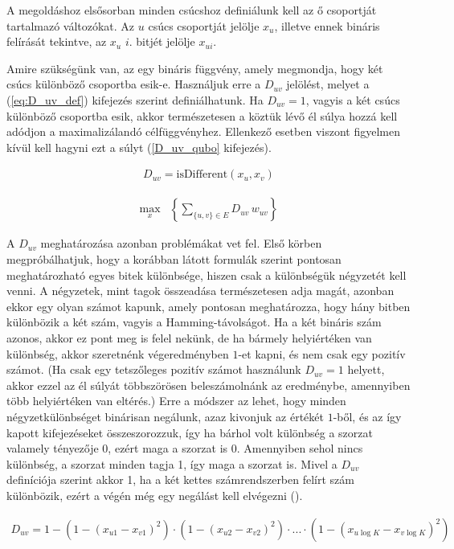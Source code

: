 A megoldáshoz elsősorban minden csúcshoz definiálunk kell az ő csoportját tartalmazó változókat. Az $u$ csúcs csoportját jelölje $x_u$, illetve ennek bináris felírását tekintve, az $x_u$ $i.$ bitjét jelölje $x_{ui}$.

Amire szükségünk van, az egy bináris függvény, amely megmondja, hogy két csúcs különböző csoportba esik-e. Használjuk erre a $D_{uv}$ jelölést, melyet a (\ref{eq:D_uv_def}) kifejezés szerint definiálhatunk. Ha $D_{uv}=1$, vagyis a két csúcs különböző csoportba esik, akkor természetesen a köztük lévő él súlya hozzá kell adódjon a maximalizálandó célfüggvényhez. Ellenkező esetben viszont figyelmen kívül kell hagyni ezt a súlyt (\ref{D_uv_qubo} kifejezés).

\begin{align}\label{eq:D_uv_def}
D_{uv} = \text{isDifferent}(x_u,x_v)
\end{align}

\begin{align} \label{D_uv_qubo}
	\max_{x} & \left\{\sum _{\{u,v\} \in E } D_{uv} \, w_{uv} \right\} 
\end{align}

A $D_{uv}$ meghatározása azonban problémákat vet fel. Első körben megpróbálhatjuk, hogy a korábban látott formulák szerint pontosan meghatározható egyes bitek különbsége, hiszen csak a különbségük négyzetét kell venni. A négyzetek, mint tagok összeadása természetesen adja magát, azonban ekkor egy olyan számot kapunk, amely pontosan meghatározza, hogy hány bitben különbözik a két szám, vagyis a Hamming-távolságot. Ha a két bináris szám azonos, akkor ez pont meg is felel nekünk, de ha bármely helyiértéken van különbség, akkor szeretnénk végeredményben $1$-et kapni, és nem csak egy pozitív számot. (Ha csak egy tetszőleges pozitív számot használunk $D_{uv}=1$ helyett, akkor ezzel az él súlyát többszörösen beleszámolnánk az eredménybe, amennyiben több helyiértéken van eltérés.) Erre a módszer az lehet, hogy minden négyzetkülönbséget binárisan negálunk, azaz kivonjuk az értékét $1$-ből, és az így kapott kifejezéseket összeszorozzuk, így ha bárhol volt különbség a szorzat valamely tényezője 0, ezért maga a szorzat is 0. Amennyiben sehol nincs különbség, a szorzat minden tagja 1, így maga a szorzat is. Mivel a $D_{uv}$ definíciója szerint akkor 1, ha a két kettes számrendszerben felírt szám különbözik, ezért a végén még egy negálást kell elvégezni ().

\begin{align}\label{eq:D_uv_poli}
	D_{uv} = 1-  \left( 1-(x_{u1}-x_{v1})^2 \right) \cdot \left( 1-(x_{u2}-x_{v2})^2 \right) \cdot ...  \cdot \left( 1-(x_{u\log K}-x_{v \log K})^2 \right) 
\end{align}

